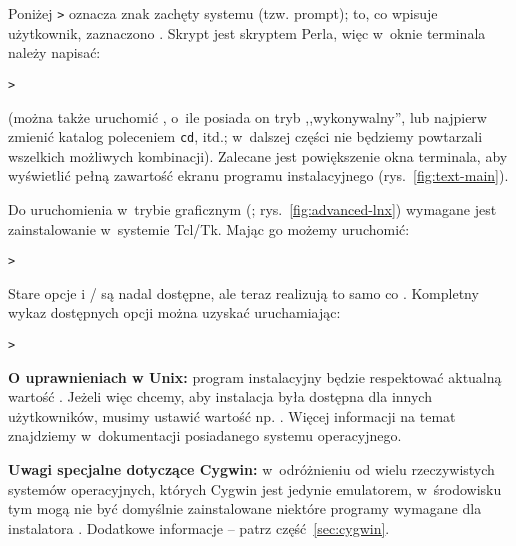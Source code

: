 \documentclass{article}
\begin{document}
\noindent
Poniżej \texttt{>} oznacza znak zachęty systemu (tzw. prompt); to,
co wpisuje użytkownik, zaznaczono . Skrypt  jest skryptem Perla, więc
w~oknie terminala należy napisać:
\begin{alltt}
> 
\end{alltt}
(można także  uruchomić , o~ile posiada
on tryb ,,wykonywalny'', lub najpierw zmienić katalog poleceniem \texttt{cd},
itd.; w~dalszej części nie będziemy powtarzali wszelkich możliwych kombinacji).
Zalecane jest powiększenie okna terminala, aby wyświetlić pełną zawartość
ekranu programu instalacyjnego (rys.~\ref{fig:text-main}).%



Do uruchomienia w~trybie graficznym (\GUI; rys.~\ref{fig:advanced-lnx}) %
wymagane jest zainstalowanie w~systemie Tcl/Tk.
Mając go możemy uruchomić:
\begin{alltt}
> 
\end{alltt}

Stare opcje  i / są nadal dostępne,
ale teraz realizują to samo co .
Kompletny wykaz dostępnych opcji można uzyskać uruchamiając:
\begin{alltt}
> 
\end{alltt}


\textbf{O  uprawnieniach w Unix:} program instalacyjny
będzie respektować aktualną wartość .
Jeżeli więc chcemy, aby instalacja była dostępna dla innych użytkowników,
musimy ustawić wartość np. . Więcej informacji na temat
 znajdziemy w~dokumentacji posiadanego systemu operacyjnego.


\textbf{Uwagi specjalne dotyczące Cygwin:} w~odróżnieniu od wielu
rzeczywistych systemów operacyjnych, których Cygwin jest jedynie emulatorem,
w~środowisku tym mogą nie być domyślnie zainstalowane niektóre programy
wymagane dla instalatora \TL. Dodatkowe informacje -- patrz
część~\ref{sec:cygwin}.
\end{document}
